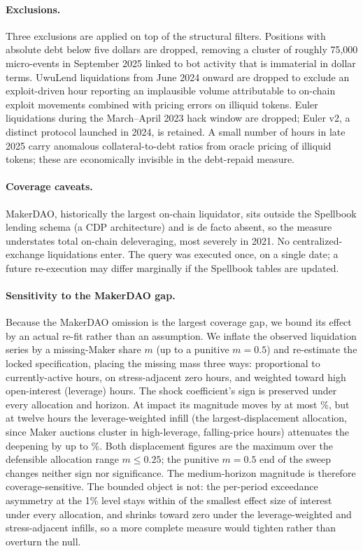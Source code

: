 \paragraph{Exclusions.}
Three exclusions are applied on top of the structural filters. Positions
with absolute debt below five dollars are dropped, removing a cluster of
roughly 75{,}000 micro-events in September 2025 linked to bot activity that
is immaterial in dollar terms. UwuLend liquidations from June 2024 onward
are dropped to exclude an exploit-driven hour reporting an implausible
volume attributable to on-chain exploit movements combined with pricing
errors on illiquid tokens. Euler liquidations during the March--April 2023
hack window are dropped; Euler v2, a distinct protocol launched in 2024, is
retained. A small number of hours in late 2025 carry anomalous
collateral-to-debt ratios from oracle pricing of illiquid tokens; these are
economically invisible in the debt-repaid measure.

\paragraph{Coverage caveats.}
MakerDAO, historically the largest on-chain liquidator, sits outside the
Spellbook lending schema (a CDP architecture) and is de facto absent, so the
measure understates total on-chain deleveraging, most severely in 2021. No
centralized-exchange liquidations enter. The query was executed once, on a
single date; a future re-execution may differ marginally if the Spellbook
tables are updated.

\paragraph{Sensitivity to the MakerDAO gap.}
Because the MakerDAO omission is the largest coverage gap, we bound its
effect by an actual re-fit rather than an assumption. We inflate the observed
liquidation series by a missing-Maker share $m$ (up to a punitive $m=0.5$)
and re-estimate the locked specification, placing the missing mass three
ways: proportional to currently-active hours, on stress-adjacent zero hours,
and weighted toward high open-interest (leverage) hours. The shock
coefficient's sign is preserved under every allocation and horizon. At impact
its magnitude moves by at most \MakerLevelImpactPct\%, but at twelve hours the
leverage-weighted infill (the largest-displacement allocation, since Maker
auctions cluster in high-leverage, falling-price hours) attenuates the
deepening by up to \MakerLevelMediumPct\%. Both displacement figures are the
maximum over the defensible allocation range $m \le 0.25$; the punitive
$m=0.5$ end of the sweep changes neither sign nor significance. The
medium-horizon magnitude is therefore coverage-sensitive. The bounded object is not: the per-period exceedance
asymmetry at the 1\% level stays within \MakerExcOverSesoi{} of the smallest
effect size of interest under every allocation, and shrinks toward zero under
the leverage-weighted and stress-adjacent infills, so a more complete measure
would tighten rather than overturn the null.